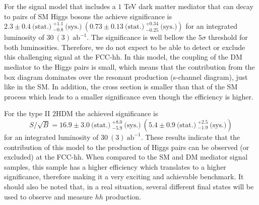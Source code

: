 For the signal model that includes a $1$ TeV dark matter mediator that can decay to pairs of SM Higgs bosons the achieve significance is $2.3\pm0.4~\text{(stat.)}~^{+1.1}_{-0.8}~\text{(sys.)}~\left(0.73\pm0.13~\text{(stat.)}~^{+0.34}_{-0.25}~\text{(sys.)}\right)$ for an integrated luminosity of $30~(3)~\text{ab}^{-1}$. The significance is well bellow the $5\sigma$ threshold for both luminosities. Therefore, we do not expect to be able to detect or exclude this challenging signal at the FCC-hh. In this model, the coupling of the DM mediator to the Higgs pairs is small, which means that the contribution from the box diagram dominates over the resonant production (s-channel diagram), just like in the SM. In addition, the cross section is smaller than that of the SM process which leads to a smaller significance even though the efficiency is higher.

For the type II 2HDM the achieved significance is
\begin{equation}
	S/\sqrt{B}=16.9\pm 3.0~\text{(stat.)}~^{+8.0}_{-5.9}~\text{(sys.)}~\left(5.4\pm 0.9~\text{(stat.)}~^{+2.5}_{-1.9}~\text{(sys.)}\right)
\end{equation}
for an integrated luminosity of $30~(3)~\text{ab}^{-1}$. These results indicate that the contribution of this model to the production of Higgs pairs can be observed (or excluded) at the FCC-hh. When compared to the SM and DM mediator signal samples, this sample has a higher efficiency which translates to a higher significance, therefore making it a very exciting and achievable benchmark. It should also be noted that, in a real situation, several different final states will be used to observe and measure $hh$ production.

